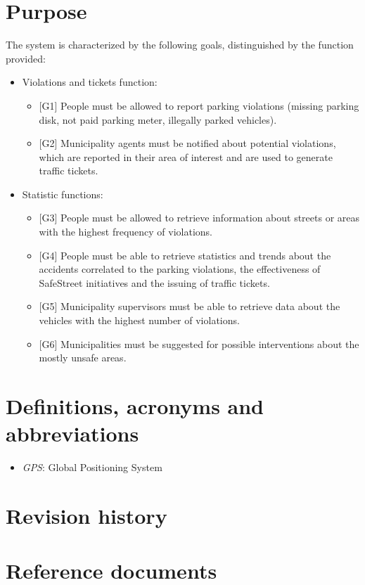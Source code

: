 \documentclass[a4paper]{report}
\begin{document}
\section{Purpose}
The system is characterized by the following goals, distinguished by the function provided:
\begin{itemize}
\item {Violations and tickets function:}

\begin{itemize}
\item{[G1]} People must be allowed to report parking violations (missing parking disk, not paid parking meter, illegally parked vehicles).
\item {[G2]} Municipality agents must be notified about potential violations, which are reported in their area of interest and are used to generate traffic tickets.	
\end{itemize}

\item {Statistic functions:}
\begin{itemize}
\item  {[G3]} People must be allowed to retrieve information about streets or areas with the highest frequency of violations.
\item  {[G4]} People must be able to retrieve statistics and trends about the accidents correlated to the parking violations, the 		effectiveness of SafeStreet initiatives and the issuing of traffic tickets.
\item  {[G5]} Municipality supervisors must be able to retrieve data about the vehicles with the highest number of violations.
\item  {[G6]} Municipalities must be suggested for possible interventions about the mostly unsafe areas.
\end{itemize}
\end{itemize}

\section{Definitions, acronyms and abbreviations}
\begin{itemize}
\item \textit{GPS}: Global Positioning System
\end{itemize}
\section{Revision history}
\lipsum[1]
\section{Reference documents}
\lipsum[1]
\end{document}
